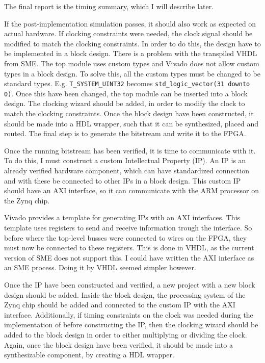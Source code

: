 The final report is the timing summary, which I will describe later.

If the post-implementation simulation passes, it should also work as expected
on actual hardware. If clocking constraints were needed, the clock signal
should be modified to match the clocking constraints. In order to do this, the
design have to be implemented in a block design. There is a problem with the
transpiled VHDL from SME. The top module uses custom types and Vivado does not
allow custom types in a block design. To solve this, all the custom types must
be changed to be standard types. E.g. \texttt{T\_SYSTEM\_UINT32} becomes
\texttt{std\_logic\_vector(31 downto 0)}. Once this have been changed, the top
module can be inserted into a block design. The clocking wizard should be
added, in order to modify the clock to match the clocking constraints. Once the
block design have been constructed, it should be made into a HDL wrapper, such
that it can be synthesized, placed and routed. The final step is to generate
the bitstream and write it to the FPGA.

Once the running bitstream has been verified, it is time to communicate with
it. To do this, I must construct a custom Intellectual Property (IP). An IP is
an already verified hardware component, which can have standardized connection
and with these be connected to other IPs in a block design. This custom IP
should have an AXI interface, so it can communicate with the ARM processor on
the Zynq chip.

Vivado provides a template for generating IPs with an AXI interfaces. This
template uses registers to send and receive information trough the interface. So
before where the top-level busses were connected to wires on the FPGA, they must
now be connected to these registers. This is done in VHDL, as the current
version of SME does not support this. I could have written the AXI interface as
an SME process. Doing it by VHDL seemed simpler however.

Once the IP have been constructed and verified, a new project with a new block
design should be added. Inside the block design, the processing system of the
Zynq chip should be added and connected to the custom IP with the AXI interface.
Additionally, if timing constraints on the clock was needed during the
implementation of before constructing the IP, then the clocking
wizard should be added to the block design in order to either multiplying or
dividing the clock. Again, once the block design have been verified, it should
be made into a synthesizable component, by creating a HDL wrapper.

